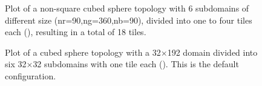 \begin{figure}
\begin{center}
\end{center} 
\caption{Plot of a non-square cubed sphere topology with 
6 subdomains of different size (nr=90,ng=360,nb=90),
divided into one to four tiles each
 (), resulting in a total of 18 tiles.
} \label{fig:18tile}
\end{figure}

\begin{figure}
\begin{center}
\end{center} 
\caption{Plot of a cubed sphere topology with a 32$\times$192 domain
divided into six 32$\times$32 subdomains with one tile each
().  This is the default configuration.
  }
\label{fig:6tile}
\end{figure}


